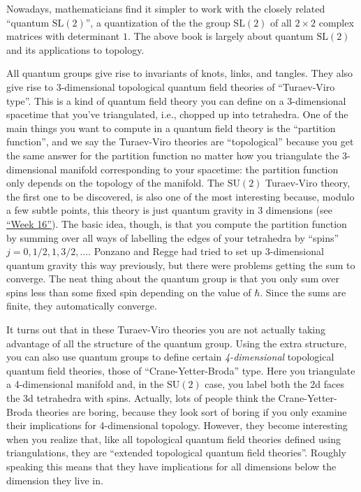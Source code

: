 \documentclass{article}
\begin{document}
Nowadays, mathematicians find it simpler to work with the closely
related ``quantum \(\mathrm{SL}(2)\)'', a quantization of the the group
\(\mathrm{SL}(2)\) of all \(2\times2\) complex matrices with determinant
\(1\). The above book is largely about quantum \(\mathrm{SL}(2)\) and
its applications to topology.

All quantum groups give rise to invariants of knots, links, and tangles.
They also give rise to 3-dimensional topological quantum field theories
of ``Turaev-Viro type''. This is a kind of quantum field theory you can
define on a 3-dimensional spacetime that you've triangulated, i.e.,
chopped up into tetrahedra. One of the main things you want to compute
in a quantum field theory is the ``partition function'', and we say the
Turaev-Viro theories are ``topological'' because you get the same answer
for the partition function no matter how you triangulate the
3-dimensional manifold corresponding to your spacetime: the partition
function only depends on the topology of the manifold. The
\(\mathrm{SU}(2)\) Turaev-Viro theory, the first one to be discovered,
is also one of the most interesting because, modulo a few subtle points,
this theory is just quantum gravity in 3 dimensions (see
\protect\hyperlink{week16}{``Week 16''}). The basic idea, though, is
that you compute the partition function by summing over all ways of
labelling the edges of your tetrahedra by ``spins''
\(j = 0, 1/2, 1, 3/2,\ldots\). Ponzano and Regge had tried to set up
3-dimensional quantum gravity this way previously, but there were
problems getting the sum to converge. The neat thing about the quantum
group is that you only sum over spins less than some fixed spin
depending on the value of \(\hbar\). Since the sums are finite, they
automatically converge.

It turns out that in these Turaev-Viro theories you are not actually
taking advantage of all the structure of the quantum group. Using the
extra structure, you can also use quantum groups to define certain
\emph{4-dimensional} topological quantum field theories, those of
``Crane-Yetter-Broda'' type. Here you triangulate a 4-dimensional
manifold and, in the \(\mathrm{SU}(2)\) case, you label both the 2d
faces the 3d tetrahedra with spins. Actually, lots of people think the
Crane-Yetter-Broda theories are boring, because they look sort of boring
if you only examine their implications for 4-dimensional topology.
However, they become interesting when you realize that, like all
topological quantum field theories defined using triangulations, they
are ``extended topological quantum field theories''. Roughly speaking
this means that they have implications for all dimensions below the
dimension they live in.
\end{document}
